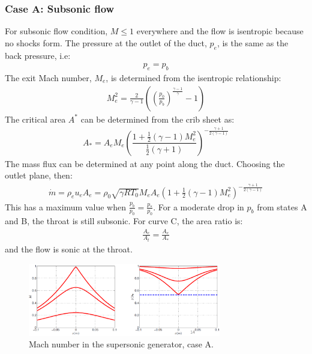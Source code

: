 \documentclass[class=report, crop=false, 12pt,a4paper]{standalone}
\begin{document}
\subsubsection{Case A: Subsonic flow}
For subsonic flow condition, $M \leq 1$ everywhere and the flow is isentropic because no shocks form. The pressure at the outlet of the duct, $p_e$, is the same as the back pressure, i.e:
\begin{gather}
    p_e = p_b
\end{gather}
The exit Mach number, $M_e$, is determined from the isentropic relationship:
\begin{gather}
    M_e^2 = \frac{2}{\gamma - 1}\left(\left(\frac{p_0}{p_b}\right)^{\frac{\gamma - 1}{\gamma}}-1\right)
\end{gather}
The critical area $A^*$ can be determined from the crib sheet as:
\begin{gather}
    A_* = A_e M_e \left(\dfrac{1 + \frac{1}{2}\left(\gamma - 1\right)M^2_e}{\frac{1}{2}\left(\gamma + 1\right)}\right)^{-\frac{\gamma + 1}{2\left(\gamma -1\right)}}
\end{gather}
The mass flux can be determined at any point along the duct. Choosing the outlet plane, then:
\begin{gather}
    \dot{m} = \rho_e u_e A_e = \rho_0 \sqrt{\gamma RT_0}M_e A_e \left(1 + \frac{1}{2}\left(\gamma - 1\right)M^2_e\right)^{-\frac{\gamma + 1}{2\left(\gamma - 1\right)}}
\end{gather}
This has a maximum value when $\frac{p_b}{p_0} = \frac{p_*}{p_0}$. For a moderate drop in $p_b$ from states A and B, the throat is still subsonic. For curve C, the area ratio is:
\begin{gather}
    \frac{A_e}{A_t} = \frac{A_e}{A_*}
\end{gather}
and the flow is sonic at the throat.
\begin{figure}[H]
    \centering
    \includegraphics[width = 0.75\textwidth]{../img/diagram57.png}
    \caption{Mach number in the supersonic generator, case A.}
\end{figure}
\end{document}
